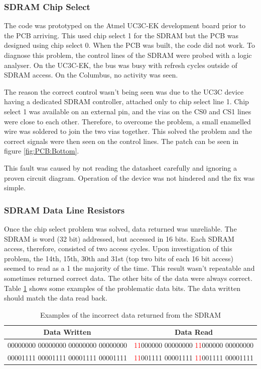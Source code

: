 
\subsubsection{SDRAM Chip Select}
The code was prototyped on the Atmel UC3C-EK development board prior to the PCB arriving. This used chip select 1 for the SDRAM but the PCB was designed using chip select 0. When the PCB was built, the code did not work. To diagnose this problem, the control lines of the SDRAM were probed with a logic analyser. On the UC3C-EK, the bus was busy with refresh cycles outside of SDRAM access. On the Columbus, no activity was seen. 

The reason the correct control wasn't being seen was due to the UC3C device having a dedicated SDRAM controller, attached only to chip select line 1. Chip select 1 was available on an external pin, and the vias on the CS0 and CS1 lines were close to each other. Therefore, to overcome the problem, a small enamelled wire was soldered to join the two vias together. This solved the problem and the correct signals were then seen on the control lines. The patch can be seen in figure \ref{fig:PCB:Bottom}. 

This fault was caused by not reading the datasheet carefully and ignoring a proven circuit diagram. Operation of the device was not hindered and the fix was simple.

\subsubsection{SDRAM Data Line Resistors}
Once the chip select problem was solved, data returned was unreliable. The SDRAM is word (32 bit) addressed, but accessed in 16 bits. Each SDRAM access, therefore, consisted of two access cycles. 
Upon investigation of this problem, the 14th, 15th, 30th and 31st (top two bits of each 16 bit access) seemed to read as a 1 the majority of the time. This result wasn't repeatable and sometimes returned correct data. The other bits of the data were always correct. Table \ref{table:SDRAM_Err} shows some examples of the problematic data bits. The data written should match the data read back. 
\begin{table}[!ht]
\caption{Examples of the incorrect data returned from the SDRAM}
\label{table:SDRAM_Err}
\begin{tabular}{cc}\toprule
Data Written							&	Data Read \\ \toprule
00000000 00000000 00000000 00000000		&	\textcolor{red}{11}000000 00000000 \textcolor{red}{11}000000 00000000 \\\midrule
00001111 00001111 00001111 00001111		&	\textcolor{red}{11}001111 00001111 \textcolor{red}{11}001111 00001111 \\ \bottomrule
\end{tabular}
\end{table}

